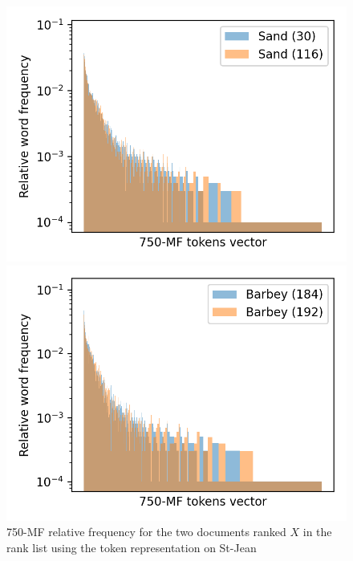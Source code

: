 \begin{figure}
  \centering
  \caption{750-MF relative frequency for the two documents ranked $X$ in the rank list using the token representation on St-Jean}

  \label{fig:mf_vector_first_rl}
  \includegraphics[width=\linewidth]{img/mf_vector_first_rl.png}

  \vspace{0.5cm}

  \label{fig:mf_vector_first_last_rl}
  \includegraphics[width=\linewidth]{img/mf_vector_first_last_rl.png}

  \vspace{0.5cm}


\end{figure}
